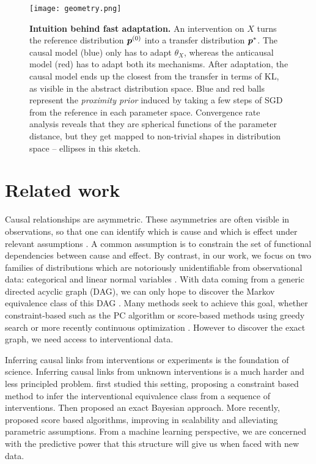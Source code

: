 \begin{figure*}
    \centering
    \texttt{[image: geometry.png]}
    \caption[Intuition behind fast adaptation]{
    \textbf{Intuition behind fast adaptation.}
    An intervention on $X$ turns the reference distribution $\bm{p}^{(0)}$ into  a transfer distribution $\bm{p}^*$.
    The causal model (blue) only has to adapt $\theta_X$, whereas the anticausal  model (red) has to adapt both its mechanisms. 
    After adaptation, the causal model ends up the closest from the transfer in terms of KL, as visible in the abstract distribution space. 
    Blue and red balls represent
    the \textit{proximity prior} induced by taking a few steps of SGD from the reference in each parameter space.
    Convergence rate analysis reveals that they are spherical functions of the parameter distance,
    but they get mapped to non-trivial shapes in distribution space -- ellipses in this sketch.
    }
    \label{fig:geometry}
\end{figure*}

\section{Related work}

Causal relationships are asymmetric.
These asymmetries are often visible in observations, so that one can identify which is cause and which is effect under relevant assumptions \citep{mooij2016distinguishing}. 
A common assumption is to constrain the set of functional dependencies between cause and effect. 
By contrast, in our work, we focus on two families of distributions which are notoriously unidentifiable from observational data: categorical and linear normal variables \citep[Ch.4]{peters2017elements}.
With data coming from a generic directed acyclic graph (DAG), we can only hope to discover the Markov equivalence class of this DAG \citep{verma1991equivalence}.
Many methods seek to achieve this goal, whether constraint-based such as the PC algorithm \citep{spirtes2000causation} or score-based methods using greedy search \citep{chickering2002optimal} or more recently continuous optimization \citep{zheng2018dags,lachapelle2019gradient}.
However to discover the exact graph, we need access to interventional data.

Inferring  causal links from interventions or experiments is the foundation of science. 
Inferring causal links from unknown interventions is a much harder and less principled problem.
\citet{tian2001causal} first studied this setting, proposing a constraint based method to infer the interventional equivalence class  from a sequence of interventions.
Then \citet{eaton2007exact} proposed an exact Bayesian approach.
More recently, \citet{squires2019permutation,ke2019learning}  proposed score based algorithms, improving in scalability and alleviating parametric assumptions.
From a machine learning perspective, we are concerned with the predictive power that this structure will give us when faced with new data.




